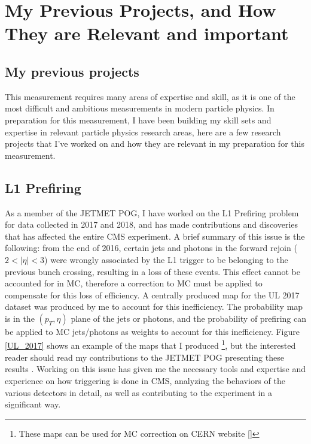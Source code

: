 \chapter{ My Previous Projects, and How They are Relevant and important}














\section{My previous projects}
This measurement requires many areas of expertise and skill, as it is one of the most difficult and ambitious measurements in modern particle physics. In preparation for this measurement, I have been building my skill sets and expertise in relevant particle physics research areas, here are a few research projects that I've worked on and how they are relevant in my preparation for this measurement.

\section{L1 Prefiring}
 As a member of the JETMET POG, I have worked on the L1 Prefiring problem for data collected in 2017 and 2018, and has made contributions and discoveries that has affected the entire CMS experiment. A brief summary of this issue is the following: from the end of 2016, certain jets and photons in the forward rejoin ($2<|\eta| <3$) were wrongly associated by the L1 trigger to be belonging to the previous bunch crossing, resulting in a loss of these events. This effect cannot be accounted for in MC, therefore a correction to MC must be applied to compensate for this loss of efficiency. A centrally produced map for the UL 2017 dataset was produced by me to account for this inefficiency. The probability map is in the $(p_T, \eta)$ plane of the jets or photons, and the probability of prefiring can be applied to MC jets/photons as weights to account for this inefficiency. Figure \ref{UL_2017} shows an example of the maps that I produced \footnote{These maps can be used for MC correction on CERN website [] }, but the interested reader should read my contributions to the JETMET POG presenting these results \cite{UL2017}. Working on this issue has given me the necessary tools and expertise and experience on how triggering is done in CMS, analyzing the behaviors of the various detectors in detail, as well as contributing to the experiment in a significant way.

